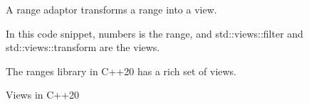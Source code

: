 A range adaptor transforms a range into a view.


In this code snippet, numbers is the range, and std::views::filter and std::views::transform are the views.

The ranges library in C++20 has a rich set of views.

\begin{center}
Views in C++20
\end{center}

